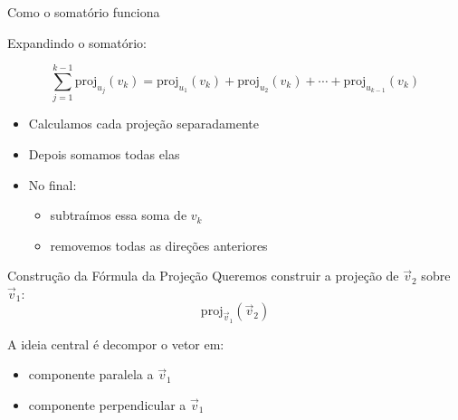 \documentclass{beamer}
\begin{document}
\begin{frame}{Como o somatório funciona}


\vspace{0.5cm}

Expandindo o somatório:

\[
\sum_{j=1}^{k-1} \mathrm{proj}_{u_j}(v_k)
=
\mathrm{proj}_{u_1}(v_k)
+
\mathrm{proj}_{u_2}(v_k)
+
\cdots
+
\mathrm{proj}_{u_{k-1}}(v_k)
\]

\vspace{0.5cm}

\begin{itemize}
    \item Calculamos cada projeção separadamente
    \item Depois somamos todas elas
\end{itemize}

\vspace{0.5cm}

\begin{itemize}
    \item No final:
    \begin{itemize}
        \item subtraímos essa soma de $v_k$
        \item removemos todas as direções anteriores
    \end{itemize}
\end{itemize}

\end{frame}
\begin{frame}{Construção da Fórmula da Projeção}
Queremos construir a projeção de $\vec{v}_2$ sobre $\vec{v}_1$:
\[
\mathrm{proj}_{\vec{v}_1}(\vec{v}_2)
\]

A ideia central é decompor o vetor em:
\begin{itemize}
    \item componente paralela a $\vec{v}_1$
    \item componente perpendicular a $\vec{v}_1$
\end{itemize}
\end{frame}
\end{document}
